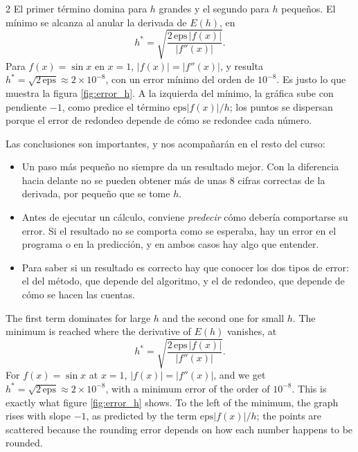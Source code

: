 \begin{paracol}{2}
El primer término domina para $h$ grandes y el segundo para $h$ pequeños. El mínimo se alcanza al anular la derivada de $E(h)$, en
$$h^*=\sqrt{\frac{2\,\text{eps}\,\vert f(x)\vert}{\vert f''(x)\vert}}.$$
Para $f(x)=\sin x$ en $x=1$, $\vert f(x)\vert=\vert f''(x)\vert$, y resulta $h^*=\sqrt{2\,\text{eps}}\approx 2\times10^{-8}$, con un error mínimo del orden de $10^{-8}$. Es justo lo que muestra la figura \ref{fig:error_h}. A la izquierda del mínimo, la gráfica sube con pendiente $-1$, como predice el término $\text{eps}\vert f(x)\vert/h$; los puntos se dispersan porque el error de redondeo depende de cómo se redondee cada número.

Las conclusiones son importantes, y nos acompañarán en el resto del curso:
\begin{itemize}
\item Un paso más pequeño no siempre da un resultado mejor. Con la diferencia hacia delante no se pueden obtener más de unas 8 cifras correctas de la derivada, por pequeño que se tome $h$.
\item Antes de ejecutar un cálculo, conviene \emph{predecir} cómo debería comportarse su error. Si el resultado no se comporta como se esperaba, hay un error en el programa o en la predicción, y en ambos casos hay algo que entender.
\item Para saber si un resultado es correcto hay que conocer los dos tipos de error: el del método, que depende del algoritmo, y el de redondeo, que depende de cómo se hacen las cuentas.
\end{itemize}
\switchcolumn
The first term dominates for large $h$ and the second one for small $h$. The minimum is reached where the derivative of $E(h)$ vanishes, at
$$h^*=\sqrt{\frac{2\,\text{eps}\,\vert f(x)\vert}{\vert f''(x)\vert}}.$$
For $f(x)=\sin x$ at $x=1$, $\vert f(x)\vert=\vert f''(x)\vert$, and we get $h^*=\sqrt{2\,\text{eps}}\approx 2\times10^{-8}$, with a minimum error of the order of $10^{-8}$. This is exactly what figure \ref{fig:error_h} shows. To the left of the minimum, the graph rises with slope $-1$, as predicted by the term $\text{eps}\vert f(x)\vert/h$; the points are scattered because the rounding error depends on how each number happens to be rounded.


\end{paracol}
